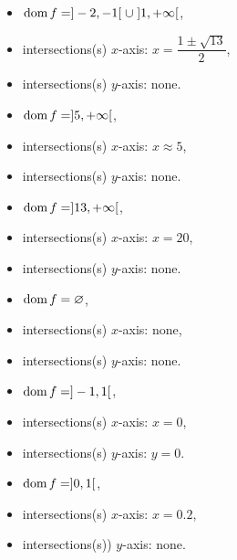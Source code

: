 \begin{Answer}\phantom{}
    \begin{multicols}{2}
    
        \Question \begin{itemize}
    	    \item $\text{dom}{\,} f= ]-2,-1[ \; \cup \; ]1, + \infty[$,
    	    \item intersections(s) $x$-axis:  $x=\dfrac{1 \pm \sqrt{13}}{2}$,
    	    \item intersections(s) $y$-axis: none.
    	    \end{itemize}
    	    
    	    \Question \begin{itemize}
    	    \item $\text{dom}{\,} f= ]5, + \infty[$,
    	    \item intersections(s) $x$-axis:  $x\approx 5$,
    	    \item intersections(s) $y$-axis: none.
    	    \end{itemize}
    	    
            \Question \begin{itemize}
    	    \item $\text{dom}{\,} f= ]13, + \infty[$,
    	    \item intersections(s) $x$-axis:  $x=20$,
    	    \item intersections(s) $y$-axis: none.
    	    \end{itemize}
    	    
            \Question \begin{itemize}
    	    \item $\text{dom}{\,} f= \varnothing$,
    	    \item intersections(s) $x$-axis: none,
    	    \item intersections(s) $y$-axis: none.
    	    \end{itemize}
    	 \ifcalculus \newpage \fi
    	    \Question \begin{itemize}
    	    \item $\text{dom}{\,} f= ]-1, 1[$,
    	    \item intersections(s) $x$-axis: $x=0$,
    	    \item intersections(s) $y$-axis: $y=0$.
    	    \end{itemize}
    	    
    	    \Question \begin{itemize}
    	    \item $\text{dom}{\,} f= ]0, 1[$,
    	    \item intersections(s) $x$-axis: $x=0.2$,
    	    \item intersections(s)) $y$-axis: none.
    	    \end{itemize}
    \EndCurrentQuestion
    \end{multicols}
\end{Answer}



